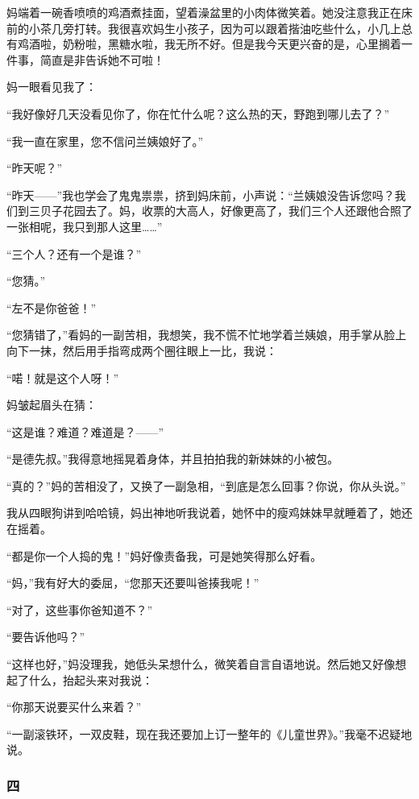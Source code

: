 \par 妈端着一碗香喷喷的鸡酒煮挂面，望着澡盆里的小肉体微笑着。她没注意我正在床前的小茶几旁打转。我很喜欢妈生小孩子，因为可以跟着揩油吃些什么，小几上总有鸡酒啦，奶粉啦，黑糖水啦，我无所不好。但是我今天更兴奋的是，心里搁着一件事，简直是非告诉她不可啦！
\par 妈一眼看见我了：
\par “我好像好几天没看见你了，你在忙什么呢？这么热的天，野跑到哪儿去了？”
\par “我一直在家里，您不信问兰姨娘好了。”
\par “昨天呢？”
\par “昨天——”我也学会了鬼鬼祟祟，挤到妈床前，小声说：“兰姨娘没告诉您吗？我们到三贝子花园去了。妈，收票的大高人，好像更高了，我们三个人还跟他合照了一张相呢，我只到那人这里……”
\par “三个人？还有一个是谁？”
\par “您猜。”
\par “左不是你爸爸！”
\par “您猜错了，”看妈的一副苦相，我想笑，我不慌不忙地学着兰姨娘，用手掌从脸上向下一抹，然后用手指弯成两个圈往眼上一比，我说：
\par “喏！就是这个人呀！”
\par 妈皱起眉头在猜：
\par “这是谁？难道？难道是？——”
\par “是德先叔。”我得意地摇晃着身体，并且拍拍我的新妹妹的小被包。
\par “真的？”妈的苦相没了，又换了一副急相，“到底是怎么回事？你说，你从头说。”
\par 我从四眼狗讲到哈哈镜，妈出神地听我说着，她怀中的瘦鸡妹妹早就睡着了，她还在摇着。
\par “都是你一个人捣的鬼！”妈好像责备我，可是她笑得那么好看。
\par “妈，”我有好大的委屈，“您那天还要叫爸揍我呢！”
\par “对了，这些事你爸知道不？”
\par “要告诉他吗？”
\par “这样也好，”妈没理我，她低头呆想什么，微笑着自言自语地说。然后她又好像想起了什么，抬起头来对我说：
\par “你那天说要买什么来着？”
\par “一副滚铁环，一双皮鞋，现在我还要加上订一整年的《儿童世界》。”我毫不迟疑地说。

\subsubsection*{四}


